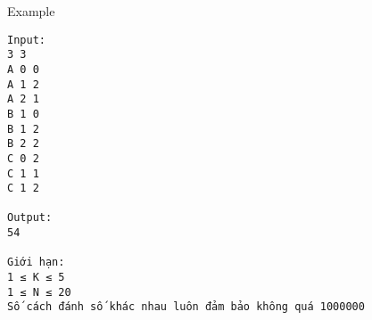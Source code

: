 Example
\begin{verbatim}
Input:
3 3
A 0 0
A 1 2
A 2 1
B 1 0
B 1 2
B 2 2
C 0 2
C 1 1
C 1 2

Output:
54

Giới hạn:
1 ≤ K ≤ 5
1 ≤ N ≤ 20
Số cách đánh số khác nhau luôn đảm bảo không quá 1000000

\end{verbatim}
